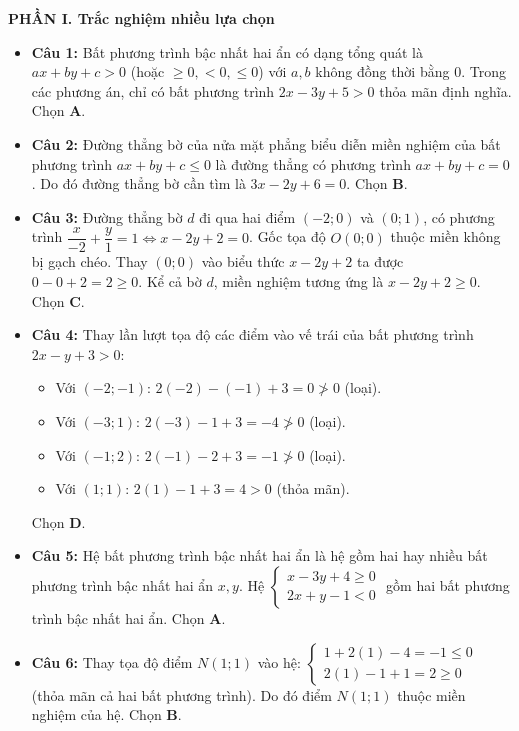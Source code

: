 \documentclass[12pt,a4paper]{article}
\begin{document}
\textbf{PHẦN I. Trắc nghiệm nhiều lựa chọn}
\begin{itemize}[leftmargin=0.6cm, itemsep=2.5pt]
    \item \textbf{Câu 1:} Bất phương trình bậc nhất hai ẩn có dạng tổng quát là $ax + by + c > 0$ (hoặc $\ge 0, < 0, \le 0$) với $a, b$ không đồng thời bằng $0$.
    Trong các phương án, chỉ có bất phương trình $2x - 3y + 5 > 0$ thỏa mãn định nghĩa. Chọn \textbf{A}.

    \item \textbf{Câu 2:} Đường thẳng bờ của nửa mặt phẳng biểu diễn miền nghiệm của bất phương trình $ax + by + c \le 0$ là đường thẳng có phương trình $ax + by + c = 0$.
    Do đó đường thẳng bờ cần tìm là $3x - 2y + 6 = 0$. Chọn \textbf{B}.

    \item \textbf{Câu 3:} Đường thẳng bờ $d$ đi qua hai điểm $(-2; 0)$ và $(0; 1)$, có phương trình $\dfrac{x}{-2} + \dfrac{y}{1} = 1 \iff x - 2y + 2 = 0$.
    Gốc tọa độ $O(0; 0)$ thuộc miền không bị gạch chéo. Thay $(0; 0)$ vào biểu thức $x - 2y + 2$ ta được $0 - 0 + 2 = 2 \ge 0$.
    Kể cả bờ $d$, miền nghiệm tương ứng là $x - 2y + 2 \ge 0$. Chọn \textbf{C}.

    \item \textbf{Câu 4:} Thay lần lượt tọa độ các điểm vào vế trái của bất phương trình $2x - y + 3 > 0$:
    \begin{itemize}[itemsep=1pt]
        \item Với $(-2; -1)$: $2(-2) - (-1) + 3 = 0 \ngtr 0$ (loại).
        \item Với $(-3; 1)$: $2(-3) - 1 + 3 = -4 \ngtr 0$ (loại).
        \item Với $(-1; 2)$: $2(-1) - 2 + 3 = -1 \ngtr 0$ (loại).
        \item Với $(1; 1)$: $2(1) - 1 + 3 = 4 > 0$ (thỏa mãn).
    \end{itemize}
    Chọn \textbf{D}.

    \item \textbf{Câu 5:} Hệ bất phương trình bậc nhất hai ẩn là hệ gồm hai hay nhiều bất phương trình bậc nhất hai ẩn $x, y$. Hệ $\begin{cases} x - 3y + 4 \ge 0 \\ 2x + y - 1 < 0 \end{cases}$ gồm hai bất phương trình bậc nhất hai ẩn. Chọn \textbf{A}.

    \item \textbf{Câu 6:} Thay tọa độ điểm $N(1; 1)$ vào hệ:
    $\begin{cases} 1 + 2(1) - 4 = -1 \le 0 \\ 2(1) - 1 + 1 = 2 \ge 0 \end{cases}$ (thỏa mãn cả hai bất phương trình).
    Do đó điểm $N(1; 1)$ thuộc miền nghiệm của hệ. Chọn \textbf{B}.


\end{itemize}
\end{document}

